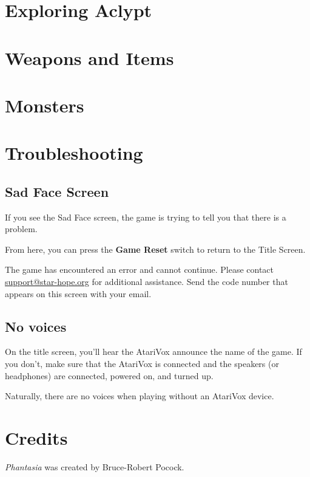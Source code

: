 \documentclass[10pt,twocolumn,openany,article]{memoir}
\begin{document}
\chapter{Exploring Aclypt}

\chapter{Weapons and Items}

\columnbreak
\chapter{Monsters}

\columnbreak
\chapter{Troubleshooting}

\section{Sad Face Screen}

If you  see the Sad  Face screen,  the game is  trying to tell  you that
there is a problem.

From here, you can press the \textbf{Game Reset} switch to return to the
Title Screen.

The game  has encountered an  error and cannot continue.  Please contact
\href{mailto:support@star-hope.org}{support@star-hope.org}           for
additional assistance. Send the code  number that appears on this screen
with your email.

\section{No voices}

On the title  screen, you'll hear the AtariVox announce  the name of the
game. If  you don't, make  sure that the  AtariVox is connected  and the
speakers (or headphones) are connected, powered on, and turned up.

Naturally,  there are  no  voices  when playing without an AtariVox device. 

\pagebreak
\chapter{Credits}


\textit{Phantasia} was created by Bruce-Robert  Pocock. 
\end{document}
